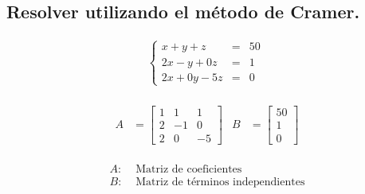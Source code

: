 \documentclass[11pt, a4paper]{article}
\begin{document}
\subsection{Resolver utilizando el método de Cramer.}
\vspace{-0.5cm}
\begin{multicols}{3}
  \begin{align*}
    \left\{
    \begin{array}{rcl}
      x+y+z &= &50\\
      2x-y+0z &= &1\\
      2x+0y-5z &= &0
    \end{array}
    \right.\
  \end{align*}
  \columnbreak\\
  \begin{align*}
    A &= \begin{bmatrix}
      1 & 1 & 1\\
      2 & -1 & 0\\
      2 & 0 & -5
    \end{bmatrix}&
    B &= \begin{bmatrix}
      50\\
      1\\
      0
    \end{bmatrix}
  \end{align*}
  \columnbreak\\
  \vspace{-0.5cm}
  \begin{align*}
    A: &\text{ Matriz de coeficientes}\\
    B: &\text{ Matriz de términos independientes}\\
  \end{align*}
\end{multicols}
\end{document}
